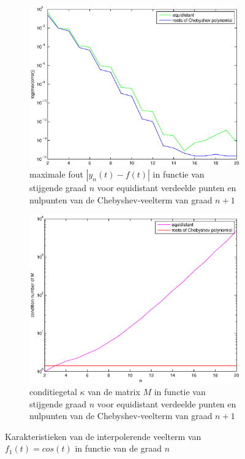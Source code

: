 \documentclass[a4paper]{article}
\begin{document}
\begin{figure}
    \centering
    \begin{subfigure}[b]{\textwidth}
        \centering
        \includegraphics[width=\textwidth]{Jona/error_global_cos.eps}
        \caption{maximale fout $|y_{n}(t)-f(t)|$ in functie van stijgende graad $n$ voor equidistant verdeelde punten en nulpunten van de Chebyshev-veelterm van graad $n+1$}
        \label{fig:error_global_cos}
        \vspace*{1cm}
    \end{subfigure}
    \begin{subfigure}[b]{\textwidth}
        \centering
        \includegraphics[width=\textwidth]{Jona/condition_cos.eps}
        \caption{conditiegetal $\kappa$ van de matrix $M$ in functie van stijgende graad $n$ voor equidistant verdeelde punten en nulpunten van de Chebyshev-veelterm van graad $n+1$}
        \label{fig:condition_cos}
        \vspace*{1cm}
    \end{subfigure}
    \hfill
    \caption{Karakteristieken van de interpolerende veelterm van $f_{1}(t) = cos(t)$ in functie van de graad $n$}
    \label{fig:characteristics_cos}
    \end{figure}
    
\end{document}
